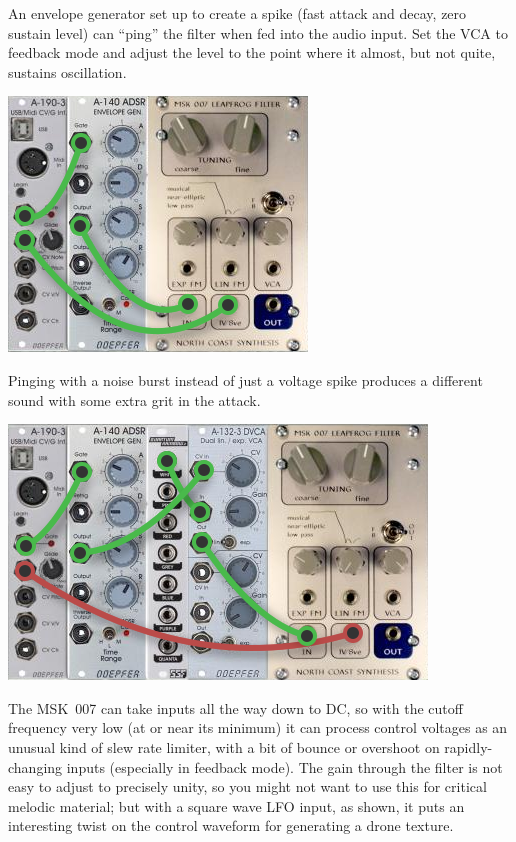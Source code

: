 An envelope generator set up to create a spike (fast attack and decay,
zero sustain level) can ``ping'' the filter when fed into the audio input. 
Set the VCA to feedback mode and adjust the level to the point where it
almost, but not quite, sustains oscillation.

\nopagebreak\noindent
{\hspace*{\fill}\includegraphics[scale=0.6]{patch5.png}\hspace*{\fill}\par}

Pinging with a noise burst instead of just a voltage spike produces a
different sound with some extra grit in the attack.

\nopagebreak\noindent
{\hspace*{\fill}\includegraphics[scale=0.6]{patch6.png}\hspace*{\fill}\par} 

\pagebreak

The MSK~007 can take inputs all the way down to DC, so
with the cutoff frequency very low (at or near its minimum) it can process
control voltages as
an unusual kind of slew rate limiter, with a bit of bounce or overshoot on
rapidly-changing inputs (especially in feedback mode).  The gain through the
filter is not easy to adjust to precisely unity, so you might not want to
use this for critical melodic material; but with a square wave LFO input, as
shown, it puts an interesting twist on the control waveform for generating
a drone texture.

